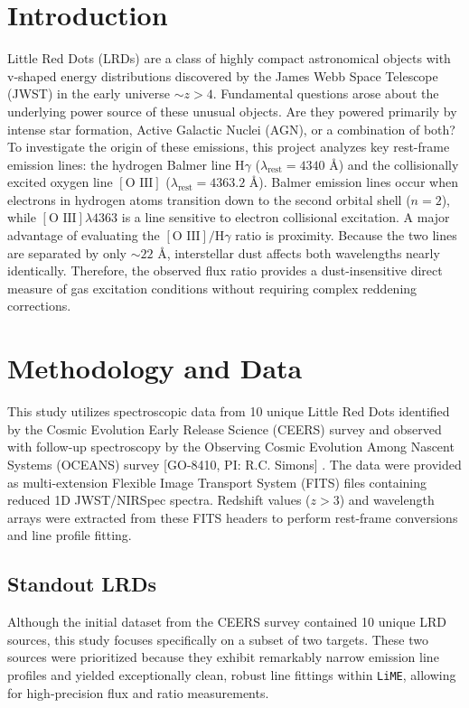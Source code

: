 \documentclass[twoside,twocolumn,12pt]{article}
\begin{document}
\section{Introduction}
\fontsize{12}{14}\selectfont
Little Red Dots (LRDs) are a class of highly compact astronomical objects with v-shaped energy distributions \citep{Davis2026} discovered by the James Webb Space Telescope (JWST) in the early universe $\sim z>4$. Fundamental questions arose about the underlying power source of these unusual objects. Are they powered primarily by intense star formation, Active Galactic Nuclei (AGN), or a combination of both? To investigate the origin of these  emissions, this project analyzes key rest-frame emission lines: the hydrogen Balmer line $\text{H}\gamma$ ($\lambda_{\text{rest}} = 4340\text{ \AA}$) and the collisionally excited oxygen line $[\text{O III}]$ ($\lambda_{\text{rest}} = 4363.2\text{ \AA}$). Balmer emission lines occur when electrons in hydrogen atoms transition down to the second orbital shell ($n=2$), while $[\text{O III}] \lambda 4363$ is a line sensitive to electron collisional excitation. A major advantage of evaluating the $[\text{O III}]/\text{H}\gamma$ ratio is proximity. Because the two lines are separated by only $\sim 22\text{ \AA}$, interstellar dust affects both wavelengths nearly identically. Therefore, the observed flux ratio provides a dust-insensitive direct measure of gas excitation conditions without requiring complex reddening corrections.\textit{
}


  

\section{Methodology and Data}
This study utilizes spectroscopic data from 10 unique Little Red Dots identified by the Cosmic Evolution Early Release Science (CEERS) survey and observed with follow-up spectroscopy by the Observing Cosmic Evolution
Among Nascent Systems (OCEANS) survey [GO-8410, PI: R.C. Simons] \citep{Finkelstein2025}. The data were provided as multi-extension Flexible Image Transport System (FITS) files containing reduced 1D JWST/NIRSpec spectra. Redshift values ($z > 3$) and wavelength arrays were extracted from these FITS headers to perform rest-frame conversions and line profile fitting. 
\fontsize{12}{14}\selectfont

\subsection{Standout LRDs}
\fontsize{12}{14}\selectfont
Although the initial dataset from the CEERS survey contained 10 unique LRD sources, this study focuses specifically on a subset of two targets. These two sources were prioritized because they exhibit remarkably narrow emission line profiles and yielded exceptionally clean, robust line fittings within \texttt{LiME}, allowing for high-precision flux and ratio measurements.
\end{document}
